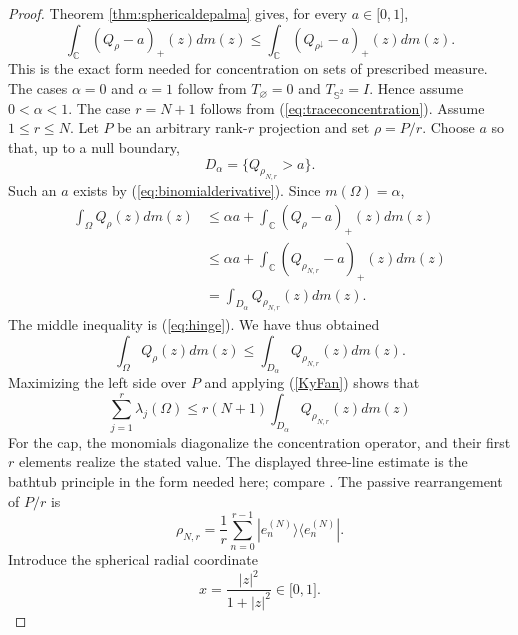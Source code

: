 \documentclass[12pt]{amsart}
\theoremstyle{plain}
\theoremstyle{definition}
\theoremstyle{remark}
\numberwithin{equation}{section}
\newcommand{\1}{\mathbf 1}
\begin{document}
\begin{proof}
Theorem \ref{thm:sphericaldepalma} gives, for every $a\in \lbrack 0,1]$, 
\begin{equation}
\int_{\mathbb{C}}(Q_{\rho }-a)_{+}(z)dm(z)\leq \int_{\mathbb{C}}(Q_{\rho
^{\downarrow }}-a)_{+}(z)dm(z).  \label{eq:hinge}
\end{equation}%
This is the exact form needed for concentration on sets of prescribed
measure. The cases $\alpha =0$ and $\alpha =1$ follow from $T_{\varnothing
}=0$ and $T_{\mathbb{S}^{2}}=I$. Hence assume $0<\alpha <1$. The case $r=N+1$
follows from (\ref{eq:traceconcentration}). Assume $1\leq r\leq N$. Let $P$
be an arbitrary rank-$r$ projection and set $\rho =P/r$. Choose $a$ so that,
up to a null boundary, 
\begin{equation*}
D_{\alpha }=\{Q_{\rho _{N,r}}>a\}.
\end{equation*}%
Such an $a$ exists by (\ref{eq:binomialderivative}). Since $m(\Omega
)=\alpha $, 
\begin{align*}
\int_{\Omega }Q_{\rho }(z)dm(z)& \leq \alpha a+\int_{\mathbb{C}}(Q_{\rho
}-a)_{+}(z)dm(z) \\
& \leq \alpha a+\int_{\mathbb{C}}(Q_{\rho _{N,r}}-a)_{+}(z)dm(z) \\
& =\int_{D_{\alpha }}Q_{\rho _{N,r}}(z)dm(z).
\end{align*}%
The middle inequality is (\ref{eq:hinge}). We have thus obtained%
\begin{equation*}
\int_{\Omega }Q_{\rho }(z)dm(z)\leq \int_{D_{\alpha }}Q_{\rho _{N,r}}(z)dm(z)%
\text{.}
\end{equation*}%
Maximizing the left side over $P$ and applying (\ref{KyFan}) shows that%
\begin{equation}
\sum_{j=1}^{r}\lambda _{j}(\Omega )\leq r(N+1)\int_{D_{\alpha }}Q_{\rho
_{N,r}}(z)dm(z)  \label{eqmainbefore}
\end{equation}%
For the cap, the monomials diagonalize the concentration operator, and their
first $r$ elements realize the stated value. The displayed three-line
estimate is the bathtub principle in the form needed here; compare \cite[%
Theorem~1.14]{LiebLoss}. The passive rearrangement of $P/r$ is 
\begin{equation}
\rho _{N,r}=\frac{1}{r}\sum_{n=0}^{r-1}|e_{n}^{(N)}\rangle \langle
e_{n}^{(N)}|.  \label{eq:flatreference}
\end{equation}%
Introduce the spherical radial coordinate 
\begin{equation}
x=\frac{|z|^{2}}{1+|z|^{2}}\in \lbrack 0,1].  \label{eq:xcoord}

\end{equation}
\end{proof}
\end{document}

